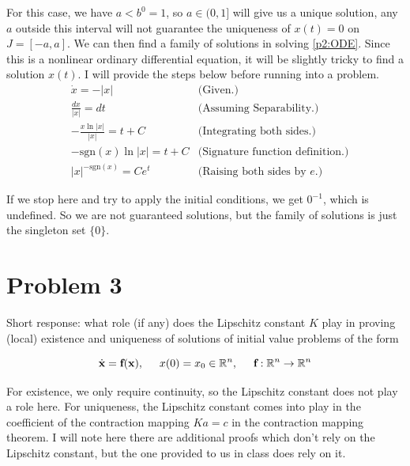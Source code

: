 \begin{solution}
    For this case, we have $a < b^{0} = 1$, so $a \in (0, 1]$ will give us a unique solution, any $a$ outside this interval will not guarantee the uniqueness of $x(t) = 0$ on $J = [-a, a]$. We can then find a family of solutions in solving \ref{p2:ODE}. Since this is a nonlinear ordinary differential equation, it will be slightly tricky to find a solution $x(t)$. I will provide the steps below before running into a problem.
    \alignbreak
    \begin{align}
        &\dot{x} = - |x| &\text{(Given.)}\nonumber\\
        &\frac{dx}{|x|} = dt    &\text{(Assuming Separability.)}\nonumber\\
        &-\frac{x\ln |x|}{|x|} = t + C  &\text{(Integrating both sides.)}\nonumber\\
        &-\text{sgn}(x)\ln |x| = t + C   &\text{(Signature function definition.)}\nonumber\\
        &|x|^{-\text{sgn}(x)} = Ce^t &\text{(Raising both sides by $e$.)}\nonumber
    \end{align}
    \alignbreak

    If we stop here and try to apply the initial conditions, we get $0^{-1}$, which is undefined. So we are not guaranteed solutions, but the family of solutions is just the singleton set $\{0\}$.
\end{solution}

\newpage
\section{Problem 3}
 Short response: what role (if any) does the Lipschitz constant $K$ play in proving (local) existence and uniqueness of solutions of initial value problems of the form

\[
\dot{\textbf{x}} = \textbf{f}(\textbf{x}), \hspace{5mm} x(0) = x_0 \in \mathbb{R}^n, \hspace{5mm} \textbf{f} : \mathbb{R}^n \rightarrow \mathbb{R}^n 
\]

\partbreak
\begin{solution}

    For existence, we only require continuity, so the Lipschitz constant does not play a role here. For uniqueness, the Lipschitz constant comes into play in the coefficient of the contraction mapping $Ka = c$ in the contraction mapping theorem. I will note here there are additional proofs which don't rely on the Lipschitz constant, but the one provided to us in class does rely on it.    
\end{solution}

